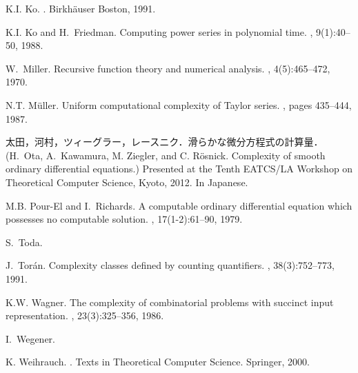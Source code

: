 \documentclass[12pt,a4paper]{article}
\theoremstyle{definition}
\theoremstyle{remark}
\begin{document}
\begin{thebibliography}{10}
K.I. Ko.
.
\newblock Birkh{\"a}user Boston, 1991.

K.I. Ko and H.~Friedman.
\newblock Computing power series in polynomial time.
, 9(1):40--50, 1988.

W.~Miller.
\newblock Recursive function theory and numerical analysis.
, 4(5):465--472, 1970.

N.T. M{\"u}ller.
\newblock Uniform computational complexity of {T}aylor series.
, pages 435--444, 1987.

太田，河村，ツィーグラー，レースニク．滑らかな微分方程式の計算量．
(H.~Ota, A.~Kawamura, M. Ziegler, and C. R{\"o}snick. 
\newblock Complexity of smooth ordinary differential equations.) 
\newblock Presented at the 
Tenth EATCS/LA Workshop on Theoretical Computer Science, Kyoto, 2012. 
In Japanese. 

M.B. Pour-El and I.~Richards.
\newblock A computable ordinary differential equation which possesses no
  computable solution.
, 17(1-2):61--90, 1979.

S.~Toda. 

J.~Tor{\'a}n.
\newblock Complexity classes defined by counting quantifiers.
, 38(3):752--773, 1991.

K.W. Wagner.
\newblock The complexity of combinatorial problems with succinct input
  representation.
, 23(3):325--356, 1986.

I.~Wegener. 

K. Weihrauch.
.
\newblock Texts in Theoretical Computer Science. Springer, 2000.
\end{thebibliography}
\end{document}
